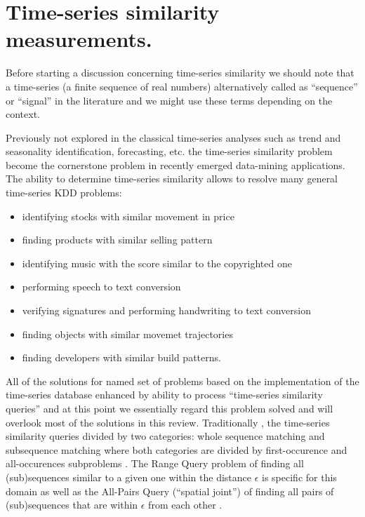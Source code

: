 \chapter{Time-series similarity measurements.}
Before starting a discussion concerning time-series similarity we should note that a time-series (a finite sequence of real numbers) alternatively called as ``sequence'' or ``signal'' in the literature and we might use these terms depending on the context.

Previously not explored in the classical time-series analyses such as trend and seasonality identification, forecasting, etc. the time-series similarity problem become the cornerstone problem in recently emerged data-mining applications. The ability to determine time-series similarity allows to resolve many general time-series KDD problems:
\begin{itemize}
	\item identifying stocks with similar movement in price \cite{citeulike:4295242} \cite{citeulike:4031865} \cite{citeulike:4025073}
	\item finding products with similar selling pattern \cite{citeulike:4326324}
	\item identifying music with the score similar to the copyrighted one \cite{citeulike:3821484} \cite{citeulike:3815076}
	\item performing speech to text conversion \cite{citeulike:3728228}
	\item verifying signatures and performing handwriting to text conversion \cite{citeulike:3733947} \cite{citeulike:3513035}
	\item finding objects with similar movemet trajectories \cite{citeulike:964832} \cite{citeulike:3728229} \cite{citeulike:3815864}
	\item finding developers with similar build patterns.
\end{itemize}

All of the solutions for named set of problems based on the implementation of the time-series database enhanced by ability to process ``time-series similarity queries'' and at this point we essentially regard this problem solved and will overlook most of the solutions in this review. Traditionally \cite{citeulike:3973409}, the time-series similarity queries divided by two categories: whole sequence matching and subsequence matching where both categories are divided by first-occurence and all-occurences subproblems \cite{citeulike:3815880}. The Range Query problem of finding all (sub)sequences similar to a given one within the distance $\epsilon$ is specific for this domain as well as the All-Pairs Query (``spatial joint'') of finding all pairs of (sub)sequences that are within $\epsilon$ from each other \cite{citeulike:3973409}.

